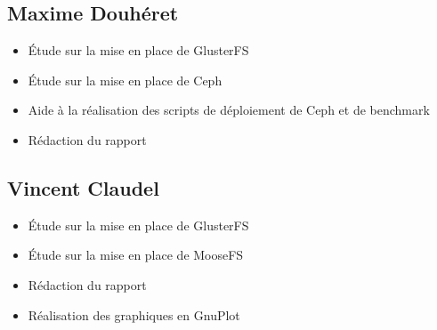 \documentclass[12pt]{report}
\begin{document}
				\subsection{Maxime Douhéret}
					\begin{itemize}
						\item Étude sur la mise en place de GlusterFS
						\item Étude sur la mise en place de Ceph
						\item Aide à la réalisation des scripts de déploiement de Ceph et de benchmark
						\item Rédaction du rapport
					\end{itemize}
				\subsection{Vincent Claudel}
					\begin{itemize}
						\item Étude sur la mise en place de GlusterFS
						\item Étude sur la mise en place de MooseFS
						\item Rédaction du rapport
						\item Réalisation des graphiques en GnuPlot
					\end{itemize}
\end{document}
